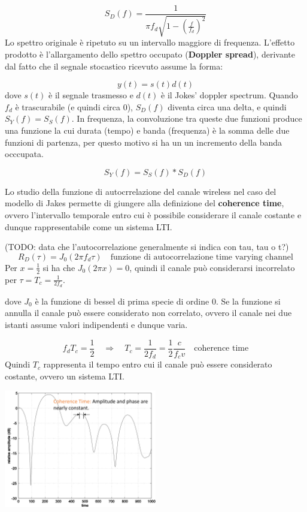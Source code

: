 \[
    S_D(f) = \frac{1}{\pi f_d \sqrt{1 - \left(\frac{f}{f_d}\right)^2}}
\]
Lo spettro originale è ripetuto su un intervallo maggiore di frequenza. L'effetto prodotto è l'allargamento dello spettro occupato (\textbf{Doppler spread}), derivante dal fatto che il segnale stocastico ricevuto assume la forma:

\[
    y(t) = s(t) d(t)
\]
dove $s(t)$ è il segnale trasmesso e $d(t)$ è il Jokes' doppler spectrum. Quando $f_d$ è trascurabile (e quindi circa 0), $S_D(f)$ diventa circa una delta, e quindi $S_Y(f) = S_S(f)$. In frequenza, la convoluzione tra queste due funzioni produce una funzione la cui durata (tempo) e banda (frequenza) è la somma delle due funzioni di partenza, per questo motivo si ha un un incremento della banda occcupata.

\[
    S_Y(f) = S_S(f) \ast S_D(f)
\]

Lo studio della funzione di autocrrelazione del canale wireless nel caso del modello di Jakes permette di giungere alla definizione del \textbf{coherence time}, ovvero l'intervallo temporale entro cui è possibile considerare il canale costante e dunque rappresentabile come un sistema LTI.


(TODO:  data che l'autocorrelazione generalmente si indica con tau, tau o t?)
\[
    R_D (\tau) = J_0(2\pi f_d \tau) \quad \text{funzione di autocorrelazione time varying channel}
\]
Per $x=\frac{1}{2}$ si ha che $J_0(2\pi x) = 0$, quindi il canale può considerarsi incorrelato per $\tau = T_c = \frac{1}{2f_d}$.

dove $J_0$ è la funzione di bessel di prima specie di ordine 0.  Se la funzione si annulla il canale può essere considerato non correlato, ovvero il canale nei due istanti assume valori indipendenti e dunque varia.

\[
    f_d T_c = \frac{1}{2} \quad \Rightarrow \quad  T_c = \frac{1}{2 f_d} = \frac{1}{2} \frac{c}{f_c v} \quad \text{coherence time}
\]
Quindi $T_c$ rappresenta il tempo entro cui il canale può essere considerato costante, ovvero un sistema LTI.
\begin{center}
    \includegraphics[width=0.5\textwidth]{imgs/coherence_time.png}
\end{center}


